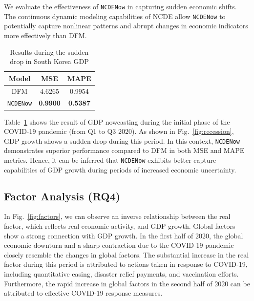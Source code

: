 \documentclass[sigconf]{acmart}
\begin{document}
We evaluate the effectiveness of \texttt{NCDENow} in capturing sudden economic shifts.
The continuous dynamic modeling capabilities of NCDE allow \texttt{NCDENow} to potentially capture nonlinear patterns and abrupt changes in economic indicators more effectively than DFM.
\begin{table}
    \vspace{-1em}
    \small
    \centering
    \caption{Results during the sudden drop in South Korea GDP}
    \label{tab:exp_recession}
    \begin{tabular}{ccc} \toprule
    Model & MSE & MAPE \\ \midrule
    DFM  & 4.6265 & 0.9954 \\
    \texttt{NCDENow} & \textbf{0.9900} & \textbf{0.5387}          \\\bottomrule
    \end{tabular}
    \vspace{-1em}
\end{table}
Table~\ref{tab:exp_recession} shows the result of GDP nowcasting during the initial phase of the COVID-19 pandemic (from Q1 to Q3 2020). As shown in Fig.~\ref{fig:recession}, GDP growth shows a sudden drop during this period. In this context, \texttt{NCDENow} demonstrates superior performance compared to DFM in both MSE and MAPE metrics. Hence, it can be inferred that \texttt{NCDENow} exhibits better capture capabilities of GDP growth during periods of increased economic uncertainty.



\subsection{Factor Analysis (RQ4)}\label{subsec:rq4}

In Fig.~\ref{fig:factors}, we can observe an inverse relationship between the real factor, which reflects real economic activity, and GDP growth. 
Global factors show a strong connection with GDP growth. In the first half of 2020, the global economic downturn and a sharp contraction due to the COVID-19 pandemic closely resemble the changes in global factors. The substantial increase in the real factor during this period is attributed to actions taken in response to COVID-19, including quantitative easing, disaster relief payments, and vaccination efforts.
Furthermore, the rapid increase in global factors in the second half of 2020 can be attributed to effective COVID-19 response measures.
\end{document}
